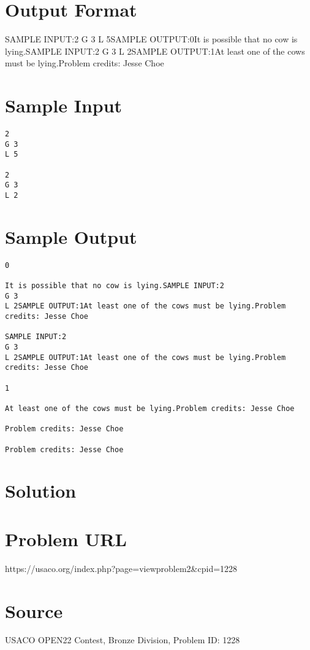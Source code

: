 \documentclass[12pt]{article}
\begin{document}
\section*{Output Format}
SAMPLE INPUT:2
G 3
L 5SAMPLE OUTPUT:0It is possible that no cow is lying.SAMPLE INPUT:2
G 3
L 2SAMPLE OUTPUT:1At least one of the cows must be lying.Problem credits: Jesse Choe

\section*{Sample Input}
\begin{verbatim}
2
G 3
L 5

2
G 3
L 2
\end{verbatim}

\section*{Sample Output}
\begin{verbatim}
0

It is possible that no cow is lying.SAMPLE INPUT:2
G 3
L 2SAMPLE OUTPUT:1At least one of the cows must be lying.Problem credits: Jesse Choe

SAMPLE INPUT:2
G 3
L 2SAMPLE OUTPUT:1At least one of the cows must be lying.Problem credits: Jesse Choe

1

At least one of the cows must be lying.Problem credits: Jesse Choe

Problem credits: Jesse Choe

Problem credits: Jesse Choe
\end{verbatim}

\section*{Solution}


\section*{Problem URL}
https://usaco.org/index.php?page=viewproblem2&cpid=1228

\section*{Source}
USACO OPEN22 Contest, Bronze Division, Problem ID: 1228
\end{document}
